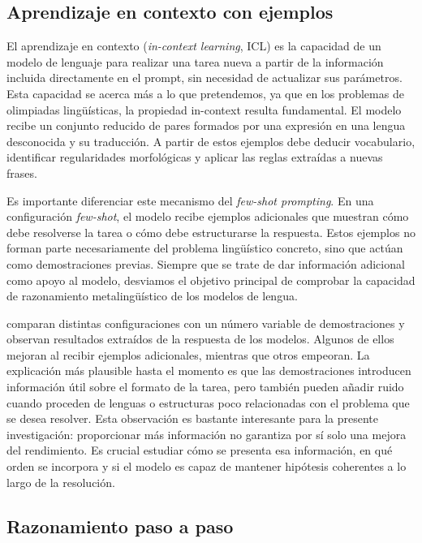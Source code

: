 \subsection{Aprendizaje en contexto con ejemplos}

El aprendizaje en contexto (\textit{in-context learning}, ICL) es la capacidad de un modelo de lenguaje para realizar una tarea nueva a partir de la información incluida directamente en el prompt, sin necesidad de actualizar sus parámetros. Esta capacidad se acerca más a lo que pretendemos, ya que en los problemas de olimpiadas lingüísticas, la propiedad in-context resulta fundamental. El modelo recibe un conjunto reducido de pares formados por una expresión en una lengua desconocida y su traducción. A partir de estos ejemplos debe deducir vocabulario, identificar regularidades morfológicas y aplicar las reglas extraídas a nuevas frases.

Es importante diferenciar este mecanismo del \textit{few-shot prompting}. En una configuración \textit{few-shot}, el modelo recibe ejemplos adicionales que muestran cómo debe resolverse la tarea o cómo debe estructurarse la respuesta. Estos ejemplos no forman parte necesariamente del problema lingüístico concreto, sino que actúan como demostraciones previas. Siempre que se trate de dar información adicional como apoyo al modelo, desviamos el objetivo principal de comprobar la capacidad de razonamiento metalingüístico de los modelos de lengua. 

\citet{sanchez2024linguini} comparan distintas configuraciones con un número variable de demostraciones y observan resultados extraídos de la respuesta de los modelos. Algunos de ellos mejoran al recibir ejemplos adicionales, mientras que otros empeoran. La explicación más plausible hasta el momento es que las demostraciones introducen información útil sobre el formato de la tarea, pero también pueden añadir ruido cuando proceden de lenguas o estructuras poco relacionadas con el problema que se desea resolver. Esta observación es bastante interesante para la presente investigación: proporcionar más información no garantiza por sí solo una mejora del rendimiento. Es crucial estudiar cómo se presenta esa información, en qué orden se incorpora y si el modelo es capaz de mantener hipótesis coherentes a lo largo de la resolución.

\subsection{Razonamiento paso a paso}


